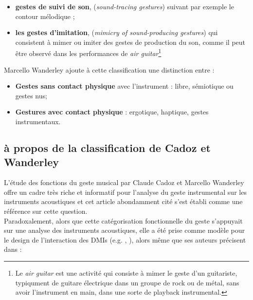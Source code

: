 \begin{itemize}[noitemsep]
	\vspace{-0.5em}
	\begin{itemize}[noitemsep]
		\item \textbf{gestes de suivi de son}, (\textit{sound-tracing gestures}) suivant par exemple le contour mélodique \cite{godoy_exploring_2006};
		\item \textbf{les gestes d'imitation}, (\textit{mimicry of sound-producing gestures}) qui consistent à mimer ou imiter des gestes de production du son, comme il peut être observé dans les performances de \textit{air guitar}\footnote{Le \textit{air guitar} est une activité qui consiste à mimer le geste d’un guitariste, typiqument de guitare électrique dans un groupe de rock ou de métal, sans avoir l’instrument en main, dans une sorte de playback instrumental.} \cite{godoy_playing_2005}
	\end{itemize}
\end{itemize}


\noindent Marcello Wanderley ajoute à cette classification une distinction entre :
\vspace{-1em}
\begin{itemize}[noitemsep]
\item \textbf{Gestes sans contact physique} avec l'instrument : libre, sémiotique ou gestes nus;
\item \textbf{Gestures avec contact physique} : ergotique, haptique, gestes instrumentaux.
\end{itemize}

\subsection{à propos de la classification de Cadoz et Wanderley}

L'étude des fonctions du geste musical par Claude Cadoz et Marcello Wanderley offre un cadre très riche et informatif pour l'analyse du geste instrumental sur les instruments acoustiques et cet article abondamment cité s'est établi comme une référence sur cette question.\\
Paradoxalement, alors que cette catégorisation fonctionnelle du geste s'appuyait sur une analyse des instruments acoustiques, elle a été prise comme modèle pour le design de l'interaction des \glspl{DMI} (e.g. \cite{arfib_strategies_2002}, \cite{schwarz_sound_2012}), alors même que ses auteurs précisent dans \cite{cadoz_gesture_2000}:\\

